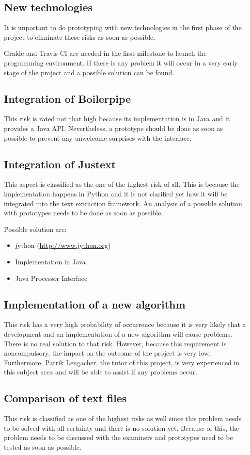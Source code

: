 \subsection{New technologies}

It is important to do prototyping with new technologies in the first phase of the project to eliminate these risks as soon as possible.

Gralde and Travis CI are needed in the first milestone to launch the programming environment. If there is any problem it will occur in a very early stage of the project and a possible solution can be found.

\subsection{Integration of Boilerpipe}

This risk is rated not that high because its implementation is in Java and it provides a Java API. Nevertheless, a prototype should be done as soon as possible to prevent any unwelcome surprises with the interface.

\subsection{Integration of Justext}
\label{subsec:Integration Justext}

This aspect is classified as the one of the highest risk of all. This is because the implementation happens in Python and it is not clarified yet how it will be integrated into the text extraction framework. An analysis of a possible solution with prototypes needs to be done as soon as possible.

Possible solution are:
\begin{itemize}
\item jython (\url{http://www.jython.org})
\item Implementation in Java
\item Java Processor Interface 
\end{itemize}


\subsection{Implementation of a new algorithm}

This risk has a very high probability of occurrence because it is very likely that a development and an implementation of a new algorithm will cause problems. There is no real solution to that risk. However, because this requirement is noncompulsory, the impact on the outcome of the project is very low. Furthermore, Patrik Lengacher, the tutor of this project, is very experienced in this subject area and will be able to assist if any problems occur.

\subsection{Comparison of text files}
This risk is classified as one of the highest risks as well since this problem needs to be solved with all certainty and there is no solution yet. Because of this, the problem needs to be discussed with the examiners and prototypes need to be tested as soon as possible.